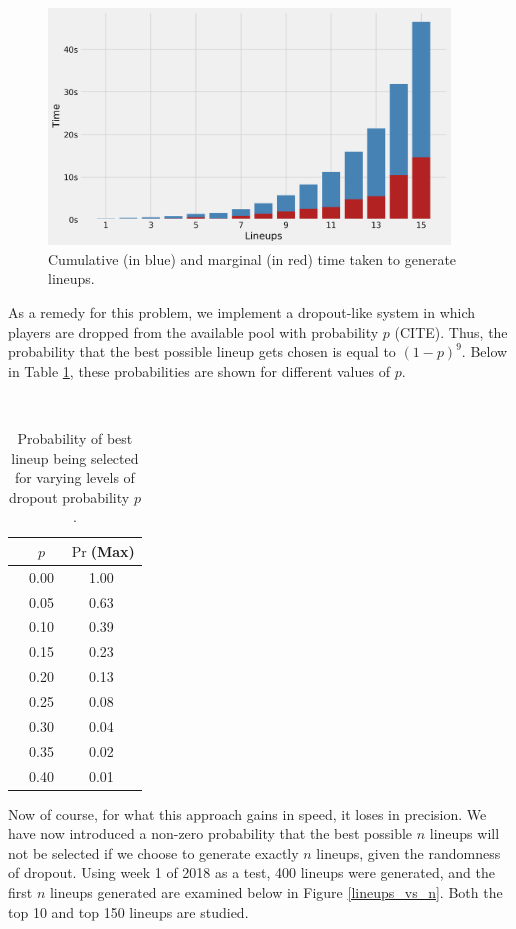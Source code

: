 \documentclass[12pt]{article}
\begin{document}
\begin{figure}[H]
  \centering
  \includegraphics[width=0.95\textwidth]{../figures/time_per_lineup}
  \caption{Cumulative (in blue) and marginal (in red) time taken to generate lineups.}
  \label{lineup times}
\end{figure}

As a remedy for this problem, we implement a dropout-like system in which players are dropped from the available pool with probability $p$ (CITE). Thus, the probability that the best possible lineup gets chosen is equal to $(1-p)^9$. Below in Table \ref{probs_of_lineups}, these probabilities are shown for different values of $p$.

﻿\begin{table}[H]
\caption{Probability of best lineup being selected for varying levels of dropout probability $p$.}
\label{probs_of_lineups}
\centering
\begin{tabular}{lcc}
\toprule
{} &     $p$ &  $\Pr$(Max)  \\
\midrule
{} &  0.00 &  1.00 \\
{} &  0.05 &  0.63 \\
{} &  0.10 &  0.39 \\
{} &  0.15 &  0.23 \\
{} &  0.20 &  0.13 \\
{} &  0.25 &  0.08 \\
{} &  0.30 &  0.04 \\
{} &  0.35 &  0.02 \\
{} &  0.40 &  0.01 \\
\bottomrule
\end{tabular}
\end{table}

Now of course, for what this approach gains in speed, it loses in precision. We have now introduced a non-zero probability that the best possible $n$ lineups will not be selected if we choose to generate exactly $n$ lineups, given the randomness of dropout. Using week 1 of 2018 as a test, 400 lineups were generated, and the first $n$ lineups generated are examined below in Figure \ref{lineups_vs_n}. Both the top 10 and top 150 lineups are studied.  
\end{document}
